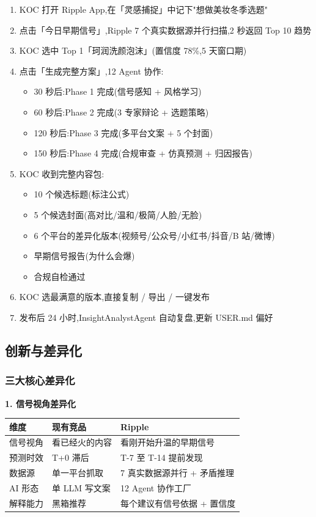 \begin{enumerate}
\item KOC 打开 Ripple App,在「灵感捕捉」中记下"想做美妆冬季选题"
\item 点击「今日早期信号」,Ripple 7 个真实数据源并行扫描,2 秒返回 Top 10 趋势
\item KOC 选中 Top 1「珂润洗颜泡沫」(置信度 78\%,5 天窗口期)
\item 点击「生成完整方案」,12 Agent 协作:
    \begin{itemize}
    \item 30 秒后:Phase 1 完成(信号感知 + 风格学习)
    \item 60 秒后:Phase 2 完成(3 专家辩论 + 选题策略)
    \item 120 秒后:Phase 3 完成(多平台文案 + 5 个封面)
    \item 150 秒后:Phase 4 完成(合规审查 + 仿真预测 + 归因报告)
    \end{itemize}
\item KOC 收到完整内容包:
    \begin{itemize}
    \item 10 个候选标题(标注公式)
    \item 5 个候选封面(高对比/温和/极简/人脸/无脸)
    \item 6 个平台的差异化版本(视频号/公众号/小红书/抖音/B 站/微博)
    \item 早期信号报告(为什么会爆)
    \item 合规自检通过
    \end{itemize}
\item KOC 选最满意的版本,直接复制 / 导出 / 一键发布
\item 发布后 24 小时,InsightAnalystAgent 自动复盘,更新 USER.md 偏好
\end{enumerate}

\subsection{创新与差异化}

\subsubsection{三大核心差异化}

\textbf{1. 信号视角差异化}

\begin{tabularx}{\textwidth}{lXX}
\toprule
\textbf{维度} & \textbf{现有竞品} & \textbf{Ripple} \\
\midrule
信号视角 & 看已经火的内容 & 看刚开始升温的早期信号 \\
预测时效 & T+0 滞后 & T-7 至 T-14 提前发现 \\
数据源 & 单一平台抓取 & 7 真实数据源并行 + 矛盾推理 \\
AI 形态 & 单 LLM 写文案 & 12 Agent 协作工厂 \\
解释能力 & 黑箱推荐 & 每个建议有信号依据 + 置信度 \\
\bottomrule
\end{tabularx}


